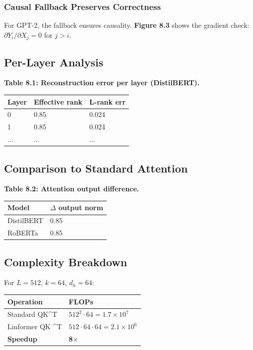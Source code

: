 \subsubsection{Causal Fallback Preserves Correctness}

For GPT-2, the fallback ensures causality. \textbf{Figure 8.3} shows the gradient 
check: $\partial Y_i / \partial X_j = 0$ for $j > i$.

\subsection{Per-Layer Analysis}

\textbf{Table 8.1: Reconstruction error per layer (DistilBERT).}

\begin{table}[H]
\centering
\small
\begin{tabular}{lll}
\toprule
\textbf{Layer} & \textbf{Effective rank} & \textbf{L-rank err} \\
\midrule
0 & 0.85 & 0.024 \\
1 & 0.85 & 0.024 \\
... & ... & ... \\
\bottomrule
\end{tabular}
\end{table}

\subsection{Comparison to Standard Attention}

\textbf{Table 8.2: Attention output difference.}

\begin{table}[H]
\centering
\small
\begin{tabular}{ll}
\toprule
\textbf{Model} & \textbf{$\Delta$ output norm} \\
\midrule
DistilBERT & 0.85 \\
RoBERTa & 0.85 \\
\bottomrule
\end{tabular}
\end{table}

\subsection{Complexity Breakdown}

For $L = 512$, $k = 64$, $d_h = 64$:

\begin{table}[H]
\centering
\small
\begin{tabular}{ll}
\toprule
\textbf{Operation} & \textbf{FLOPs} \\
\midrule
Standard QK^T & $512^2 \cdot 64 = 1.7 \times 10^7$ \\
Linformer QK ^T & $512 \cdot 64 \cdot 64 = 2.1 \times 10^6$ \\
\textbf{Speedup} & \textbf{8$\times$} \\
\bottomrule
\end{tabular}
\end{table}

